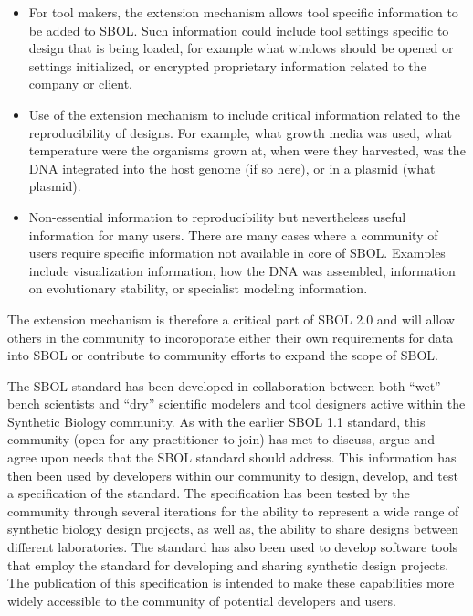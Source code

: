 \begin{itemize}
\item For tool makers, the extension mechanism allows tool specific information to be added to SBOL. Such information could include tool settings specific to design that is being loaded, for example what windows should be opened or settings initialized, or encrypted proprietary information related to the company or client.
\item Use of the extension mechanism to include critical information related to the reproducibility of designs. For example, what growth media was used, what temperature were the organisms grown at, when were they harvested, was the DNA integrated into the host genome (if so here), or in a plasmid (what plasmid).
\item Non-essential information to reproducibility but nevertheless useful information for many users. There are many cases where a community of users require specific information not available in core of SBOL. Examples include visualization information, how the DNA was assembled, information on evolutionary stability, or specialist modeling information.
\end{itemize}

The extension mechanism is therefore a critical part of SBOL 2.0 and will allow others in the community to incoroporate either their own requirements for data into SBOL or contribute to community efforts to expand the scope of SBOL.


The SBOL standard has been developed in collaboration between both ``wet'' bench scientists and ``dry'' scientific modelers and tool designers active within the Synthetic Biology community. 
As with the earlier SBOL 1.1 standard, this community (open for any practitioner to join) has met to discuss, argue and agree upon needs that the SBOL standard should address. 
This information has then been used by developers within our community to design, develop, and test a specification of the standard. The specification has been tested by the community through several iterations for the ability to represent a wide range of synthetic biology design projects, as well as, the ability to share designs between different laboratories. 
The standard has also been used to develop software tools that employ the standard for developing and sharing synthetic design projects. 
The publication of this specification is intended to make these capabilities more widely accessible to the community of potential developers and users.